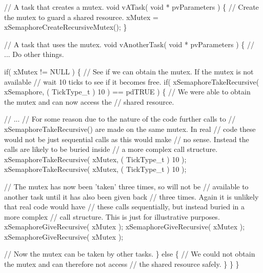 \begin{DoxyPre}// A task that creates a mutex.
void vATask( void * pvParameters )
\{
   // Create the mutex to guard a shared resource.
   xMutex = xSemaphoreCreateRecursiveMutex();
\}\end{DoxyPre}



\begin{DoxyPre}// A task that uses the mutex.
void vAnotherTask( void * pvParameters )
\{
   // ... Do other things.\end{DoxyPre}



\begin{DoxyPre}   if( xMutex != NULL )
   \{
       // See if we can obtain the mutex.  If the mutex is not available
       // wait 10 ticks to see if it becomes free.
       if( xSemaphoreTakeRecursive( xSemaphore, ( TickType\_t ) 10 ) == pdTRUE )
       \{
           // We were able to obtain the mutex and can now access the
           // shared resource.\end{DoxyPre}



\begin{DoxyPre}           // ...
           // For some reason due to the nature of the code further calls to
        // xSemaphoreTakeRecursive() are made on the same mutex.  In real
        // code these would not be just sequential calls as this would make
        // no sense.  Instead the calls are likely to be buried inside
        // a more complex call structure.
           xSemaphoreTakeRecursive( xMutex, ( TickType\_t ) 10 );
           xSemaphoreTakeRecursive( xMutex, ( TickType\_t ) 10 );\end{DoxyPre}



\begin{DoxyPre}           // The mutex has now been 'taken' three times, so will not be
        // available to another task until it has also been given back
        // three times.  Again it is unlikely that real code would have
        // these calls sequentially, but instead buried in a more complex
        // call structure.  This is just for illustrative purposes.
           xSemaphoreGiveRecursive( xMutex );
        xSemaphoreGiveRecursive( xMutex );
        xSemaphoreGiveRecursive( xMutex );\end{DoxyPre}



\begin{DoxyPre}        // Now the mutex can be taken by other tasks.
       \}
       else
       \{
           // We could not obtain the mutex and can therefore not access
           // the shared resource safely.
       \}
   \}
\}
\end{DoxyPre}
 
